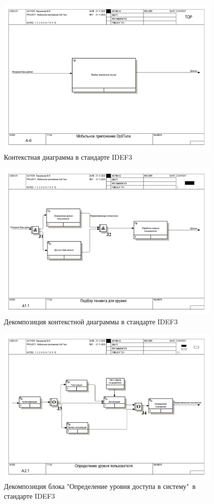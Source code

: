 \documentclass[14pt]{extreport}
\begin{document}
\begin{landscape}
\begin{figure}[H]
\centerline{\includegraphics[width=0.9\linewidth]{idef30}}
\caption{Контекстная диаграмма в стандарте IDEF3}
\label{fig5}
\end{figure}

\begin{figure}[H]
\centerline{\includegraphics[width=0.9\linewidth]{idef31}}
\caption{Декомпозиция контекстной диаграммы в стандарте IDEF3}
\label{fig6}
\end{figure}

\begin{figure}[H]
\centerline{\includegraphics[width=0.9\linewidth]{idef312}}
\caption{Декомпозиция блока "Определение уровня доступа в систему"\ в стандарте IDEF3}
\label{fig7}
\end{figure}


\end{landscape}
\end{document}
